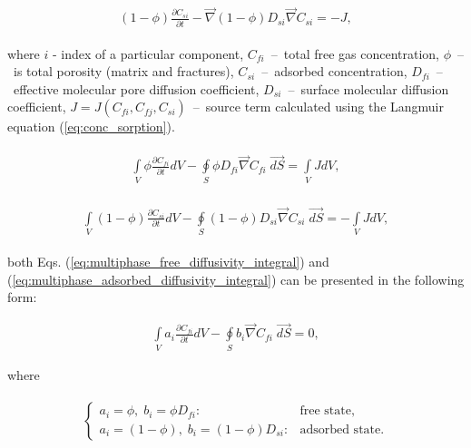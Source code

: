 \documentclass[a4paper,14pt,english]{extreport}
\begin{document}
\begin{eqnarray}
\begin{gathered}
\label{eq:multiphase_adsorbed_diffusivity_differential}
\left(1-\phi\right) \frac{\partial C_{si}}{\partial t}  - \vec{\nabla} \left(1-\phi\right) D_{si} \vec{\nabla}C_{si} = -J,
\end{gathered}
\end{eqnarray}

where $i$ - index of  a particular component, $C_{fi}$~--~total free gas concentration, $\phi$~--~is total porosity (matrix and fractures), $C_{si}$~--~adsorbed concentration, $D_{fi}$~--~effective molecular pore diffusion coefficient, $D_{si}$~--~surface molecular diffusion coefficient, $J=J\left(C_{fi}, C_{fj}, C_{si} \right)$~--~source term calculated using the Langmuir equation (\ref{eq:conc_sorption}).

\begin{eqnarray}
\begin{gathered}
\label{eq:multiphase_free_diffusivity_integral}
\int \limits_{V} \phi \frac{\partial C_{fi}}{\partial t} dV  - \oint \limits_{S} \phi D_{fi} \vec{\nabla}C_{fi} \; \vec{dS} = \int \limits_{V} J dV,
\end{gathered}
\end{eqnarray}

\begin{eqnarray}
\begin{gathered}
\label{eq:multiphase_adsorbed_diffusivity_integral}
\int \limits_{V} \left(1-\phi\right) \frac{\partial C_{si}}{\partial t} dV - \oint \limits_{S} \left(1-\phi\right) D_{si} \vec{\nabla}C_{si} \; \vec{dS} = -\int \limits_{V}JdV,
\end{gathered}
\end{eqnarray}

both Eqs. (\ref{eq:multiphase_free_diffusivity_integral}) and (\ref{eq:multiphase_adsorbed_diffusivity_integral}) can be presented in the following form:

\begin{eqnarray}
\label{eq:multiphase_diffusivity_simplified_integral}
\int \limits_{V} a_{i} \frac{\partial C_{fi}}{\partial t} dV - \oint \limits_{S} b_{i} \vec{\nabla}C_{fi} \; \vec{dS} = 0,
\end{eqnarray}

where 

\begin{eqnarray}
\label{eq:multiphase_diffusivity_a_b_coeffs}
\begin{gathered}
\begin{cases}
a_{i} = \phi, \; b_{i} = \phi D_{fi}: &\text{free state},\\
a_{i} = \left(1-\phi\right), \; b_{i} = \left(1-\phi\right) D_{si}: &\text{adsorbed state}.
\end{cases}
\end{gathered}
\end{eqnarray}
\end{document}
